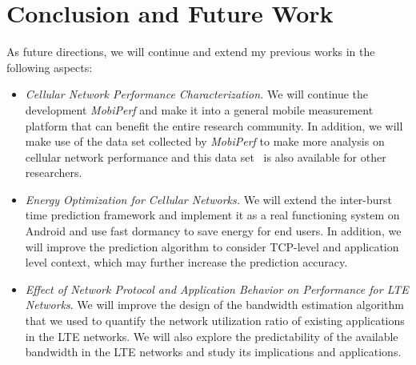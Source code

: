 \chapter{Conclusion and Future Work}
\label{chap:conc}




As future directions, we will continue and extend my previous works in the following aspects:
\begin{itemize}
\item \emph{Cellular Network Performance Characterization.} We will continue the development \emph{MobiPerf} and make it into a general mobile measurement platform that can benefit the entire research community. In addition, we will make use of the data set collected by \emph{MobiPerf} to make more analysis on cellular network performance and this data set~\cite{mobiperf.data} is also available for other researchers.
\item \emph{Energy Optimization for Cellular Networks.} We will extend the inter-burst time prediction framework and implement it as a real functioning system on Android and use fast dormancy to save energy for end users. In addition, we will improve the prediction algorithm to consider TCP-level and application level context, which may further increase the prediction accuracy.
\item \emph{Effect of Network Protocol and Application Behavior on Performance for LTE Networks}. We will improve the design of the bandwidth estimation algorithm that we used to quantify the network utilization ratio of existing applications in the LTE networks. We will also explore the predictability of the available bandwidth in the LTE networks and study its implications and applications.
\end{itemize}